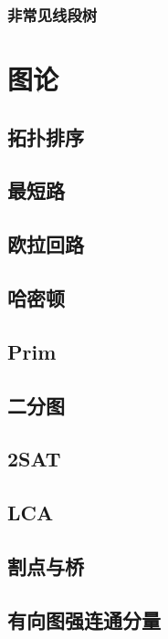 \documentclass{article}
\begin{document}
\subsubsection{非常见线段树}


\section{图论}
\subsection{拓扑排序}

\subsection{最短路}

\subsection{欧拉回路}

\subsection{哈密顿}

\subsection{Prim}

\subsection{二分图}

\subsection{2SAT}

\subsection{LCA}

\subsection{割点与桥}

\subsection{有向图强连通分量}

\end{document}
